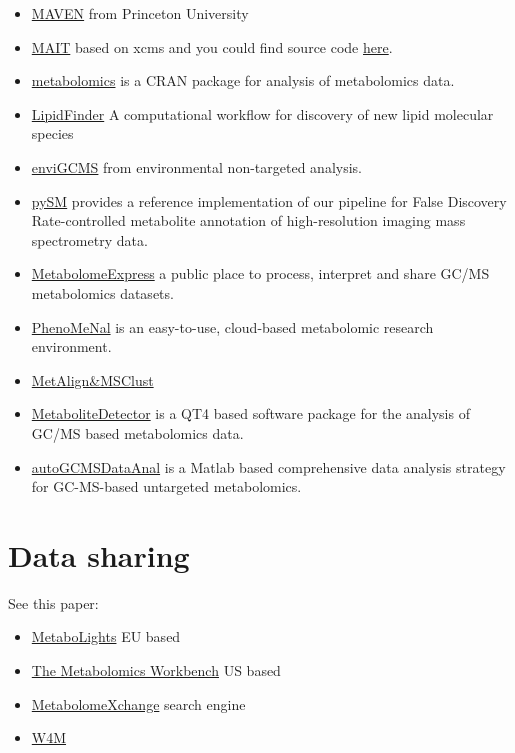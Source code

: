 \documentclass[
]{book}
\begin{document}
\begin{itemize}
\item
  \href{http://genomics-pubs.princeton.edu/mzroll/index.php?show=index}{MAVEN} from Princeton University
\item
  \href{https://www.bioconductor.org/packages/release/bioc/html/MAIT.html}{MAIT} based on xcms and you could find source code \href{https://github.com/jpgroup/MAIT}{here}\citep{fernandez-albert2014a}.
\item
  \href{https://github.com/cran/metabolomics}{metabolomics} is a CRAN package for analysis of metabolomics data.
\item
  \href{https://github.com/ODonnell-Lipidomics/LipidFinder}{LipidFinder} A computational workflow for discovery of new lipid molecular species
\item
  \href{https://github.com/yufree/enviGCMS}{enviGCMS} from environmental non-targeted analysis.
\item
  \href{https://github.com/alexandrovteam/pySM}{pySM} provides a reference implementation of our pipeline for False Discovery Rate-controlled metabolite annotation of high-resolution imaging mass spectrometry data.
\item
  \href{https://www.metabolome-express.org/}{MetabolomeExpress} a public place to process, interpret and share GC/MS metabolomics datasets.
\item
  \href{https://portal.phenomenal-h2020.eu/home}{PhenoMeNal} is an easy-to-use, cloud-based metabolomic research environment.
\item
  \href{https://www.wur.nl/en/show/MetAlign.htm}{MetAlign\&MSClust}
\item
  \href{http://md.tu-bs.de/node/3}{MetaboliteDetector} is a QT4 based software package for the analysis of GC/MS based metabolomics data.
\item
  \href{http://software.tobaccodb.org/software/autogcmsdataanal}{autoGCMSDataAnal} is a Matlab based comprehensive data analysis strategy for GC-MS-based untargeted metabolomics\citep{zhang2020}.
\end{itemize}

\hypertarget{data-sharing}{%
\section{Data sharing}\label{data-sharing}}

See this paper\citep{haug2017}:

\begin{itemize}
\item
  \href{http://www.ebi.ac.uk/metabolights/}{MetaboLights} EU based
\item
  \href{http://www.metabolomicsworkbench.org/}{The Metabolomics Workbench} US based
\item
  \href{http://www.metabolomexchange.org/site/}{MetabolomeXchange} search engine
\item
  \href{http://workflow4metabolomics.org/}{W4M\citep{guitton2017}}
\end{itemize}
\end{document}
